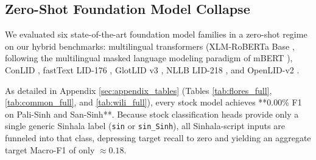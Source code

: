 \documentclass[11pt]{article}
\begin{document}
\subsection{Zero-Shot Foundation Model Collapse}
We evaluated six state-of-the-art foundation model families in a zero-shot regime on our hybrid benchmarks: multilingual transformers (XLM-RoBERTa Base \cite{conneau2020unsupervised}, following the multilingual masked language modeling paradigm of mBERT \cite{devlin2019bert}), ConLID \cite{dunn2023commonlid}, fastText LID-176 \cite{joulin2017bag}, GlotLID v3 \cite{kargaran2023glotlid}, NLLB LID-218 \cite{nllb2022}, and OpenLID-v2 \cite{burchell2023openlid}.

As detailed in Appendix \ref{sec:appendix_tables} (Tables \ref{tab:flores_full}, \ref{tab:common_full}, and \ref{tab:wili_full}), every stock model achieves **0.00\% F1 on Pali-Sinh and San-Sinh**. Because stock classification heads provide only a single generic Sinhala label (\texttt{sin} or \texttt{sin\_Sinh}), all Sinhala-script inputs are funneled into that class, depressing target recall to zero and yielding an aggregate target Macro-F1 of only $\approx 0.18$.
\end{document}
